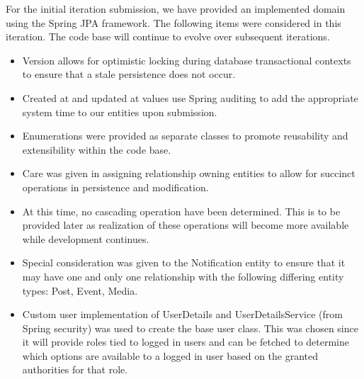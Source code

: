 For the initial iteration submission, we have provided an implemented domain using the
Spring JPA framework. The following items were considered in this iteration. The code base will continue to evolve over subsequent iterations.
\begin{itemize}
    \item Version allows for optimistic locking during database transactional contexts to ensure that a stale persistence does not occur.

    \item Created at and updated at values use Spring auditing to add the appropriate system time to our entities upon submission.

    \item Enumerations were provided as separate classes to promote reusability and extensibility within the code base.

    \item Care was given in assigning relationship owning entities to allow for succinct operations in persistence and modification.

    \item At this time, no cascading operation have been determined. This is to be provided later as realization of these operations will become more available while development continues.

    \item Special consideration was given to the Notification entity to ensure that it may have one and only one relationship with the following differing entity types: Post, Event, Media.

    \item Custom user implementation of UserDetails and UserDetailsService (from Spring security) was used to create the base user class. This was chosen since it will provide roles tied to logged in users and can be fetched to determine which options are available to a logged in user based on the granted authorities for that role.
\end{itemize}